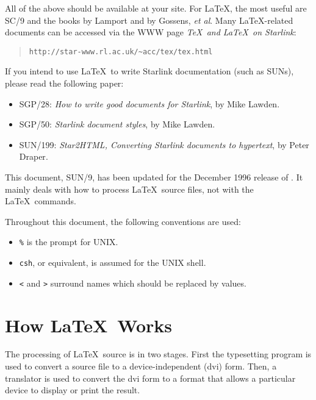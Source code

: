 \documentclass[11pt,twoside]{article}
\newcommand{\htmladdnormallink}[2]{#1}
\newcommand{\xref}[3]{#1}
\newcommand{\xlabel}[1]{}
\begin{document}
All of the above should be available at your site.
For \LaTeX, the most useful are SC/9
and the books by Lamport and by Gossens, \emph{et al}.
Many \LaTeX-related documents can be accessed via the WWW page 
\emph{\TeX\ and \LaTeX\ on Starlink}:

\begin{quote}
      \htmladdnormallink{\texttt{http://star-www.rl.ac.uk/\~{}acc/tex/tex.html}}
      {http://star-www.rl.ac.uk/\~{}acc/tex/tex.html}
\end{quote}

If you intend to use \LaTeX\ to write Starlink documentation (such as SUNs), 
please read the following paper:
\begin{itemize}
  \item \xref{SGP/28: 
         \emph{How to write good documents for Starlink}}{sgp28}{},
         by Mike Lawden\cite{sgp28}.
  \item \xref{SGP/50: 
         \emph{Starlink document styles}}{sgp50}{},
         by Mike Lawden\cite{sgp50}.
  \item \xref{SUN/199: 
         \emph{Star2HTML, Converting Starlink documents to hypertext}}{sun199}{},
         by Peter Draper\cite{sun199}.
\end{itemize}

This document, SUN/9, has been updated for the December 1996 release of \LaTeXe.
It mainly deals with how to process \LaTeX\
source files, not with the \LaTeX\ commands.

Throughout this document, the following conventions are used:

\begin{itemize}
  \item \texttt{\%} is the prompt for UNIX.
  \item \texttt{csh}, or equivalent, is assumed for the UNIX shell.
  \item \texttt{<} and \texttt{>} surround names which should be replaced
        by values.
\end{itemize}

\section{\xlabel{how_latex_works}\label{how_latex_works}How \LaTeX\ Works}

The processing of \LaTeX\ source is in two stages. First the
typesetting program is used to convert a source file to a device-independent
(dvi) form. Then, a translator is used to convert the dvi form to a format that
allows a particular device to display or print the result.
\end{document}
